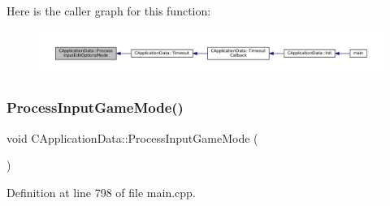Here is the caller graph for this function\+:
\nopagebreak
\begin{figure}[H]
\begin{center}
\leavevmode
\includegraphics[width=350pt]{classCApplicationData_a345f47a19a5abcc9aeeb6b02b4aaf31b_icgraph}
\end{center}
\end{figure}
\hypertarget{classCApplicationData_a018490e670662ed9a9266449516a2ac7}{}\label{classCApplicationData_a018490e670662ed9a9266449516a2ac7} 
\subsubsection{\texorpdfstring{Process\+Input\+Game\+Mode()}{ProcessInputGameMode()}}
{\footnotesize\ttfamily void C\+Application\+Data\+::\+Process\+Input\+Game\+Mode (\begin{DoxyParamCaption}{ }\end{DoxyParamCaption})\hspace{0.3cm}{\ttfamily [protected]}}



Definition at line 798 of file main.\+cpp.


